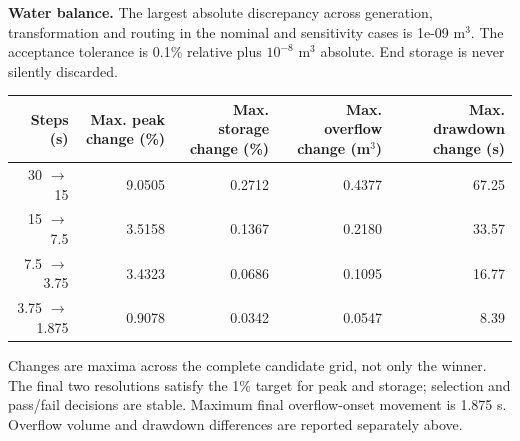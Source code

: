 \documentclass[10pt,letterpaper]{article}
\begin{document}
\textbf{Water balance.} The largest absolute discrepancy across generation, transformation and routing in the nominal and sensitivity cases is 1e-09 m$^3$. The acceptance tolerance is 0.1\% relative plus $10^{-8}$ m$^3$ absolute. End storage is never silently discarded.

\begin{center}\small\begin{tabular}{rrrrr}\toprule
Steps (s) & Max. peak change (\%) & Max. storage change (\%) & Max. overflow change (m$^3$) & Max. drawdown change (s) \\\midrule
30 $\to$ 15 & 9.0505 & 0.2712 & 0.4377 & 67.25 \\
15 $\to$ 7.5 & 3.5158 & 0.1367 & 0.2180 & 33.57 \\
7.5 $\to$ 3.75 & 3.4323 & 0.0686 & 0.1095 & 16.77 \\
3.75 $\to$ 1.875 & 0.9078 & 0.0342 & 0.0547 & 8.39 \\
\bottomrule\end{tabular}\end{center}
{\footnotesize Changes are maxima across the complete candidate grid, not only the winner. The final two resolutions satisfy the 1\% target for peak and storage; selection and pass/fail decisions are stable. Maximum final overflow-onset movement is 1.875 s. Overflow volume and drawdown differences are reported separately above.}
\end{document}
